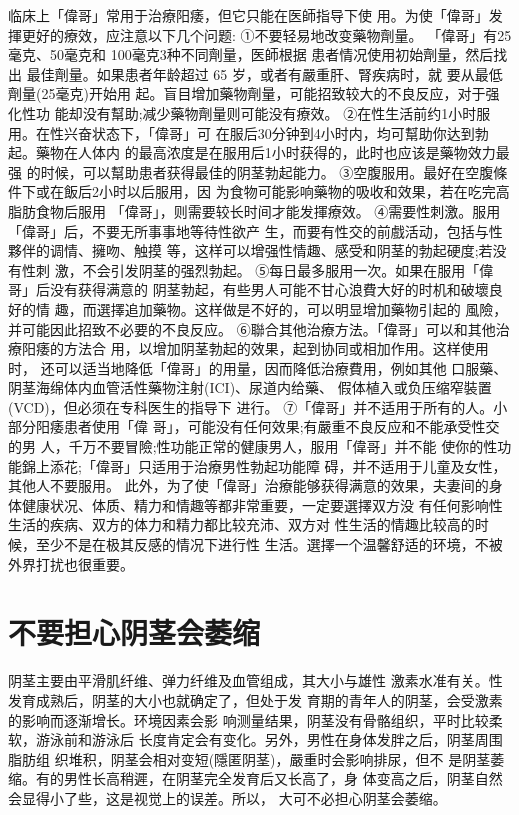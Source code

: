 \documentclass[12pt,UTF8]{ctexbook}
\begin{document}
临床上「偉哥」常用于治療阳痿，但它只能在医師指导下使
用。为使「偉哥」发揮更好的療效，应注意以下几个问题:
①不要轻易地改变藥物劑量。
「偉哥」有25毫克、50毫克和
100毫克3种不同劑量，医師根据
患者情况使用初始劑量，然后找出
最佳劑量。如果患者年龄超过 65
岁，或者有嚴重肝、腎疾病时，就
要从最低劑量(25毫克)开始用
起。盲目增加藥物劑量，可能招致较大的不良反应，对于强化性功
能却没有幫助;减少藥物劑量则可能没有療效。
②在性生活前约1小时服用。在性兴奋状态下，「偉哥」可
在服后30分钟到4小时内，均可幫助你达到勃起。藥物在人体内
的最高浓度是在服用后1小时获得的，此时也应该是藥物效力最强
的时候，可以幫助患者获得最佳的阴茎勃起能力。
③空腹服用。最好在空腹條件下或在飯后2小时以后服用，因
为食物可能影响藥物的吸收和效果，若在吃完高脂肪食物后服用
「偉哥」，则需要较长时间才能发揮療效。
④需要性刺激。服用「偉哥」后，不要无所事事地等待性欲产
生，而要有性交的前戲活动，包括与性夥伴的调情、擁吻、触摸
等，这样可以增强性情趣、感受和阴茎的勃起硬度;若没有性刺
激，不会引发阴茎的强烈勃起。
⑤每日最多服用一次。如果在服用「偉哥」后没有获得满意的
阴茎勃起，有些男人可能不甘心浪費大好的时机和破壞良好的情
趣，而選擇追加藥物。这样做是不好的，可以明显增加藥物引起的
風險，并可能因此招致不必要的不良反应。
⑥聯合其他治療方法。「偉哥」可以和其他治療阳痿的方法合
用，以增加阴茎勃起的效果，起到协同或相加作用。这样使用时，
还可以适当地降低「偉哥」的用量，因而降低治療費用，例如其他
口服藥、阴茎海绵体内血管活性藥物注射(ICI)、尿道内给藥、
假体植入或负压缩窄裝置(VCD)，但必须在专科医生的指导下
进行。
⑦「偉哥」并不适用于所有的人。小部分阳痿患者使用「偉
哥」，可能没有任何效果;有嚴重不良反应和不能承受性交的男
人，千万不要冒險;性功能正常的健康男人，服用「偉哥」并不能
使你的性功能錦上添花;「偉哥」只适用于治療男性勃起功能障
碍，并不适用于儿童及女性，其他人不要服用。
此外，为了使「偉哥」治療能够获得满意的效果，夫妻间的身
体健康状况、体质、精力和情趣等都非常重要，一定要選擇双方没
有任何影响性生活的疾病、双方的体力和精力都比较充沛、双方对
性生活的情趣比较高的时候，至少不是在极其反感的情况下进行性
生活。選擇一个温馨舒适的环境，不被外界打扰也很重要。

\section{不要担心阴茎会萎缩}
阴茎主要由平滑肌纤维、弹力纤维及血管组成，其大小与雄性
激素水准有关。性发育成熟后，阴茎的大小也就确定了，但处于发
育期的青年人的阴茎，会受激素的影响而逐渐增长。环境因素会影
响测量结果，阴茎没有骨骼组织，平时比较柔软，游泳前和游泳后
长度肯定会有变化。另外，男性在身体发胖之后，阴茎周围脂肪组
织堆积，阴茎会相对变短(隱匿阴茎)，嚴重时会影响排尿，但不
是阴茎萎缩。有的男性长高稍遲，在阴茎完全发育后又长高了，身
体变高之后，阴茎自然会显得小了些，这是视觉上的误差。所以，
大可不必担心阴茎会萎缩。
\end{document}
